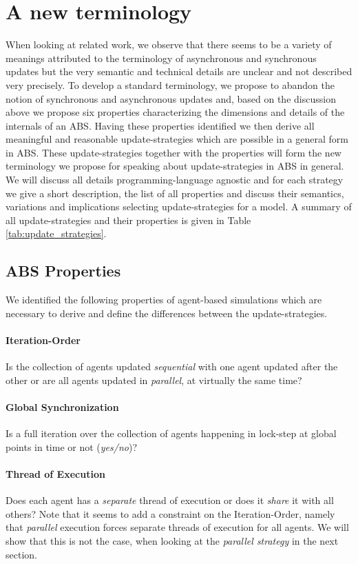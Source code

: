 \section{A new terminology}
When looking at related work, we observe that there seems to be a variety of meanings attributed to the terminology of asynchronous and synchronous updates but the very semantic and technical details are unclear and not described very precisely. To develop a standard terminology, we propose to abandon the notion of synchronous and asynchronous updates and, based on the discussion above we propose six properties characterizing the dimensions and details of the internals of an ABS. Having these properties identified we then derive all meaningful and reasonable update-strategies which are possible in a general form in ABS. These update-strategies together with the properties will form the new terminology we propose for speaking about update-strategies in ABS in general. We will discuss all details programming-language agnostic and for each strategy we give a short description, the list of all properties and discuss their semantics, variations and implications selecting update-strategies for a model. A summary of all update-strategies and their properties is given in Table \ref{tab:update_strategies}.

\subsection{ABS Properties}
We identified the following properties of agent-based simulations which are necessary to derive and define the differences between the update-strategies.

\paragraph{Iteration-Order}
Is the collection of agents updated \textit{sequential} with one agent updated after the other or are all agents updated in \textit{parallel}, at virtually the same time?

\paragraph{Global Synchronization}
Is a full iteration over the collection of agents happening in lock-step at global points in time or not (\textit{yes/no})?

\paragraph{Thread of Execution}
Does each agent has a \textit{separate} thread of execution or does it \textit{share} it with all others? Note that it seems to add a constraint on the Iteration-Order, namely that \textit{parallel} execution forces separate threads of execution for all agents. We will show that this is not the case, when looking at the \textit{parallel strategy} in the next section.

